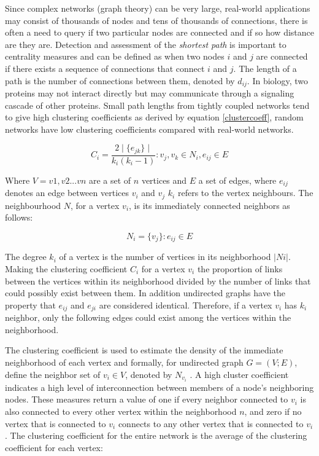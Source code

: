 \documentclass[a4paper,8pt,twocolumn,5p]{elsarticle}
\begin{document}
Since complex networks (graph theory) can be very large, real-world applications may consist of thousands of nodes and tens of thousands of connections, there is often a need to query if two particular nodes are connected and if so how distance are they are. Detection and assessment of  the {\it shortest path} is important to centrality measures and can be defined as when two nodes $i$ and $j$ are connected if there exists  a sequence of connections that  connect $i$ and $j$. The length of a path is the number of connections between them, denoted by $d_{ij}$. In biology, two proteins may not interact directly but may communicate through a signaling cascade of other proteins. Small path lengths from tightly coupled networks tend to give high clustering coefficients as derived by equation \ref{clustercoeff}, random networks have low clustering coefficients compared with real-world networks. 

\begin{equation}\label{clustercoeff} 
     C_{i}  =  \frac{2\mid\{e_{jk} \}\mid}{k_{i}(k_{i} - 1)} : v_{j}, v_{k} \in N_{i}, e_{ij} \in E
\end{equation}

Where $V = v1, v2  ... vn$ are a set of $n$ vertices and $E$ a set of edges, where $e_{ij}$ denotes an edge between
vertices $v_i$ and $v_j$ $k_i$ refers to the vertex neighbours. The neighbourhood $N$, for a vertex $v_i$, is its immediately connected neighbors as follows:

\begin{equation}\label{neighbour}
     N_{i}  =  \{v_{j}\}:e_{ij} \in E
\end{equation}

The degree $k_i$ of a vertex is the number of vertices in its neighborhood $| Ni |$.  Making the clustering coefficient $C_i$ for a vertex $v_i$ the proportion of links between the vertices within its neighborhood divided by the number of links that could possibly exist between them. In addition undirected graphs have the property that $e_{ij}$ and $e_{ji}$ are considered identical. Therefore, if a vertex $v_i$ has $k_i$ neighbor, only the following edges could exist among the vertices within the neighborhood. 

The clustering coefficient is used to estimate the density of the immediate neighborhood of each vertex  and formally, for undirected graph $G = (V;E)$, define the neighbor set of $v_i \in V$, denoted by $N_{v_i}$ .  A high cluster coefficient indicates a high level of interconnection between members of a node's neighboring nodes. These measures return a value of one if every neighbor connected to $v_i$ is also connected to every other vertex within the neighborhood $n$, and zero if no vertex that is connected to $v_i$ connects to any other vertex that is connected to $v_i$.  The clustering coefficient for the entire network is the average of the clustering coefficient for each vertex:
\end{document}
